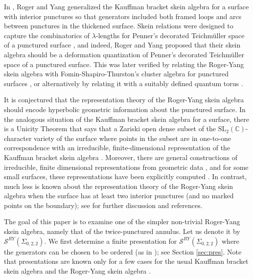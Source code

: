 \documentclass{article}
\newcommand{\C}{\mathbb{C}}
\newcommand{\san}{\Sigma_{0,2,2}}
\theoremstyle{definition}
\renewcommand{\san}{\Sigma_{0, 2, 2}}
\begin{document}
In \cite{RogerYang}, Roger and Yang  generalized the Kauffman bracket skein algebra for a surface with interior punctures so that generators included both framed loops and arcs between punctures in the thickened surface.  Skein relations were designed to capture the combinatorics of $\lambda$-lengths for Penner's decorated Teichmüller space of a punctured surface \cite{PennerDecoratedTeichCMP, PennerDecoratedTeichJDG}, and indeed, Roger and Yang proposed that their skein algebra should be a deformation quantization of Penner's decorated Teichmüller space of a punctured surface.  This was later verified  by relating the Roger-Yang skein algebra  with Fomin-Shapiro-Thurston's cluster algebra for punctured surfaces \cite{MoonWongQT, MoonWongComp}, or alternatively by relating it with a suitably defined quantum torus \cite{BKLQTrace}.   

It is conjectured that the representation theory of the Roger-Yang skein algebra should encode hyperbolic geometric information about the punctured surface.  In the analogous situation of the Kauffman bracket skein algebra for a surface, there is a Unicity Theorem that says that a Zariski open dense subset of the $\mathrm{SL}_2(\C)$-character variety of the surface where points in the subset are in one-to-one correspondence with an irreducible, finite-dimensional representation of the Kauffman bracket skein algebra
 \cite{FKBLUnicity, GJSUnicity, KKUnicity}.  Moreover, there are general constructions of irreducible, finite dimensional representations from geometric data \cite{BonWonSkeinReps2, BonWonSkeinReps3}, and for some small surfaces, these  representations have been explicitly computed \cite{TakenovReps, YuReps}.  In contrast, much less is known about the representation theory of the Roger-Yang skein algebra when the surface has at least two interior punctures (and no marked points on the boundary);  see \cite{KaruoMoonWongCenter} for further discussion and references.  

The goal of this paper is to examine one of the simpler non-trivial Roger-Yang skein algebra,  namely that of the twice-punctured annulus. Let us denote it by $\mathcal S^{RY}(\san)$. We first determine a finite presentation for $\mathcal S^{RY}(\san)$ where the generators can be chosen to be ordered (as in \cite{FrohmanAbdielAGT}); see Section \ref{sec:pres}.    Note that presentations are known only for a few cases for the usual Kauffman bracket skein algebra \cite{BullockPrz, CookeGenus2, CookeAskeyWilson} and the Roger-Yang skein algebra \cite{BobbPeiferInvolve, MoonPuncSph}.   
\end{document}

